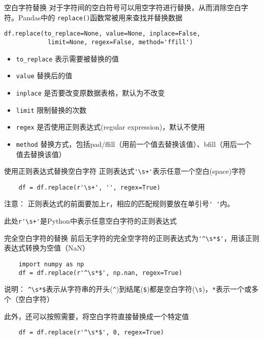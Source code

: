 \documentclass[t]{beamer}
\begin{document}
\begin{frame}[fragile]{空白字符替换}
对于字符间的空白符号可以用空字符进行替换，从而消除空白字符。Pandas中的
\verb|replace()|函数常被用来查找并替换数据
\begin{lstlisting}
df.replace(to_replace=None, value=None, inplace=False, 
            limit=None, regex=False, method='ffill')
\end{lstlisting}\normalsize
\begin{itemize}
    \item \verb|to_replace| 表示需要被替换的值
    \item \verb|value| 替换后的值
    \item \verb|inplace| 是否要改变原数据表格，默认为不改变
    \item \verb|limit| 限制替换的次数
    \item \verb|regex| 是否使用正则表达式({\color{red}reg}ular {\color{red}ex}pression)，默认不使用
    \item \verb|method| 替换方式，包括pad/ffill（用前一个值去替换该值）、bfill（用后一个
    值去替换该值）
\end{itemize}
\end{frame}


\begin{frame}[fragile]{使用正则表达式替换空白字符}
    正则表达式\verb|'\s+'|表示任意一个空白(space)字符
\begin{lstlisting}
    df = df.replace(r'\s+', '', regex=True)
\end{lstlisting}

\begin{block}{注意：}
    正则表达式的前面要加上\verb|r|，相应的匹配规则要放在单引号\verb|' '|内。

    此处\verb|r'\s+'|是Python中表示{\color{red}任意空白字符}的正则表达式
\end{block}
\end{frame}


\begin{frame}[fragile]{完全空白字符的替换}
    前后无字符的完全空字符的正则表达式为\verb|'^\s*$'|，用该正则表达式转换为空值（NaN）
\begin{lstlisting}
    import numpy as np
    df = df.replace(r'^\s*$', np.nan, regex=True)
\end{lstlisting}
\begin{block}{说明：}
\verb|^\s*$|表示从字符串的开头(\verb|^|)到结尾(\texttt{\$})都是空白字符(\verb|\s|)，\verb|*|表示一个或多个（空白字符）
\end{block}
此外，还可以按照需要，将空白字符直接替换成一个特定值
\begin{lstlisting}
    df = df.replace(r'^\s*$', 0, regex=True)
\end{lstlisting}
\end{frame}
\end{document}
